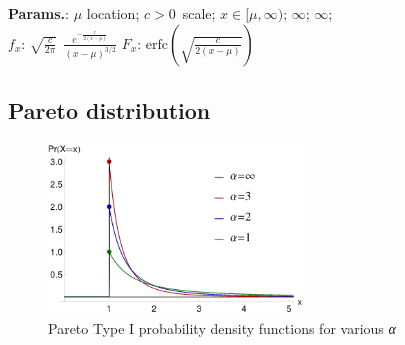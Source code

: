     {\color{darkblue} \textbf{Params.}:} {$\mu$ location; $c > 0\,$ scale}; {$x \in [\mu, \infty)$}; {$\infty$}; {$\infty$};\hspace{0.5cm}\\{\color{darkblue} \textbf{$f_x$}:} {$\sqrt{\frac{c}{2\pi}}~~\frac{e^{-\frac{c}{2(x-\mu)}}}{(x-\mu)^{3/2}}$}{\color{darkblue} \textbf{$F_x$}:} {$\textrm{erfc}\left(\sqrt{\frac{c}{2(x-\mu)}}\right)$}



    
        
\subsection{Pareto distribution}


    \begin{figure}[H]
        \centering
        \includegraphics[width=0.6\textwidth]{images/Probability density function of Pareto distribution.png}
        \caption{Pareto Type I probability density functions for various \textit{α}}
    \end{figure}




